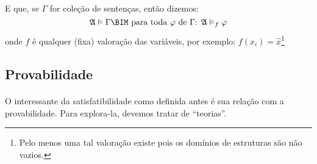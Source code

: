         \paragraph{}
            E que, se $\Gamma$ for coleção de sentenças, então dizemos:
            $$\mathfrak{A}\vDash\Gamma\BIM\text{ para toda }\varphi\text{ de }\Gamma\text{: }\mathfrak{A}\vDash_f\varphi$$
            onde $f$ é qualquer (fixa) valoração das variáveis, por exemplo: $f(x_i)=\hat{x}$\footnote{Pelo menos uma tal
            valoração existe pois os domínios de estruturas são não vazios.}

        \subsection{Provabilidade}
        \paragraph{}
            O interessante da satisfatibilidade como %
            definida antes é sua relação com a
            provabilidade. Para explora-la, devemos
            tratar de ``teorias''.
